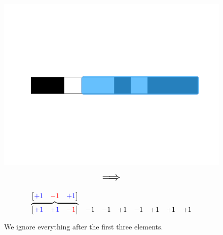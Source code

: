         \begin{figure}[ht]
            \begin{minipage}{.35\textwidth}
              \centering
              \includegraphics[width=.9\linewidth]{images/convolutional_neural_networks_images/1d_window1.png} 
            \end{minipage}
            \begin{minipage}{.1\textwidth}
                \centering
                $$\mathlarger{\mathlarger{\mathlarger{\implies}}}$$
            \end{minipage}
            \begin{minipage}{.2\textwidth}
                \centering
                \begin{equation*}
                    \begin{matrix}
                        \overbrace{
                        \begin{bmatrix}\textcolor{blue}{+1}&\textcolor{blue}{+1}&\textcolor{red}{-1}\end{bmatrix}
                        }^{\begin{bmatrix}
                          \textcolor{blue}{+1} & \textcolor{red}{-1} & \textcolor{blue}{+1}
                        \end{bmatrix}}
                        &
                        -1&-1&
                        +1&-1&
                        +1&+1&+1
                    \end{matrix}
                \end{equation*}
            \end{minipage}
            \caption*{We ignore everything after the first three elements.}
        \end{figure}

